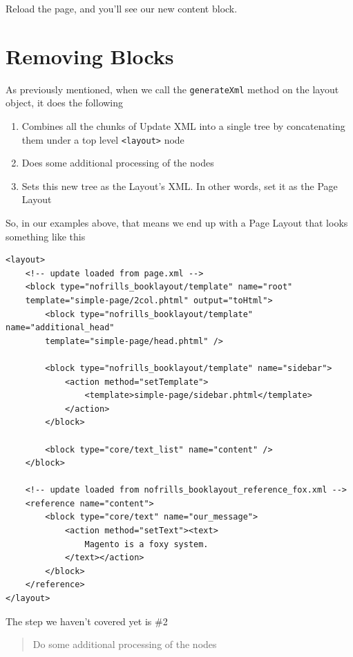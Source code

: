 \documentclass[oneside]{book}
\begin{document}
Reload the page, and you'll see our new content block. 

\section{Removing Blocks}

As previously mentioned, when we call the \footnotesize\texttt{generateXml} \normalsize  method on the layout object, it does the following

\begin{enumerate}
\item Combines all the chunks of Update XML into a single tree by concatenating them under a top level \footnotesize\texttt{\textless layout\textgreater } \normalsize  node
\item Does some additional processing of the nodes
\item Sets this new tree as the Layout's XML.  In other words, set it as the Page Layout
\end{enumerate}


So, in our examples above, that means we end up with a Page Layout that looks something like this

\begin{lstlisting}
<layout>
    <!-- update loaded from page.xml -->
    <block type="nofrills_booklayout/template" name="root"
    template="simple-page/2col.phtml" output="toHtml">
        <block type="nofrills_booklayout/template" name="additional_head"
        template="simple-page/head.phtml" />

        <block type="nofrills_booklayout/template" name="sidebar">
            <action method="setTemplate">
                <template>simple-page/sidebar.phtml</template>
            </action>
        </block>

        <block type="core/text_list" name="content" />
    </block>    

    <!-- update loaded from nofrills_booklayout_reference_fox.xml -->
    <reference name="content">
        <block type="core/text" name="our_message">
            <action method="setText"><text>
                Magento is a foxy system.
            </text></action>
        </block>
    </reference>                
</layout>

\end{lstlisting}


The step we haven't covered yet is \#2

\begin{quote}
Do some additional processing of the nodes
\end{quote}
\end{document}
